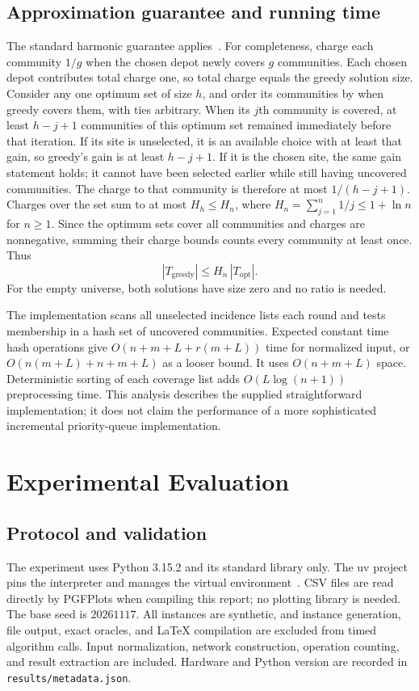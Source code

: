 \documentclass[sigconf,nonacm]{acmart}
\begin{document}
\subsection{Approximation guarantee and running time}
The standard harmonic guarantee applies~\cite{chvatal}. For completeness,
charge each community $1/g$ when the chosen depot newly covers $g$
communities. Each chosen depot contributes total charge one, so total charge
equals the greedy solution size. Consider any one optimum set of size $h$,
and order its communities by when greedy covers them, with ties arbitrary.
When its $j$th community is covered, at least $h-j+1$ communities of this
optimum set remained immediately before that iteration. If its site is
unselected, it is an available choice with at least that gain, so greedy's
gain is at least $h-j+1$. If it is the chosen site, the same gain statement
holds; it cannot have been selected earlier while still having uncovered
communities. The charge to that community is therefore at most
$1/(h-j+1)$. Charges over the set sum to at most $H_h\le H_n$, where
$H_n=\sum_{j=1}^n1/j\le1+\ln n$ for $n\ge1$.
Since the optimum sets cover all communities and charges are nonnegative,
summing their charge bounds counts every community at least once. Thus
\[
 |T_{\mathrm{greedy}}|\le H_n\,|T_{\mathrm{opt}}|.
\]
For the empty universe, both solutions have size zero and no ratio is needed.

The implementation scans all unselected incidence lists each round and
tests membership in a hash set of uncovered communities. Expected constant
time hash operations give $O(n+m+L+r(m+L))$ time for normalized input, or
$O(n(m+L)+n+m+L)$ as a looser bound. It uses $O(n+m+L)$ space.
Deterministic sorting of each coverage list adds
$O(L\log(n+1))$ preprocessing time. This analysis describes the supplied
straightforward implementation; it does not claim the performance of a
more sophisticated incremental priority-queue implementation.

\section{Experimental Evaluation}
\subsection{Protocol and validation}
The experiment uses Python 3.15.2 and its standard library only. The uv project
pins the interpreter and manages the virtual environment~\cite{uv}. CSV files are read
directly by PGFPlots when compiling this report; no plotting library is
needed. The base seed is $20261117$. All instances are synthetic, and
instance generation, file output, exact oracles, and LaTeX compilation are
excluded from timed algorithm calls. Input normalization, network construction,
operation counting, and result extraction are included. Hardware and Python
version are recorded in \texttt{results/metadata.json}.
\end{document}
